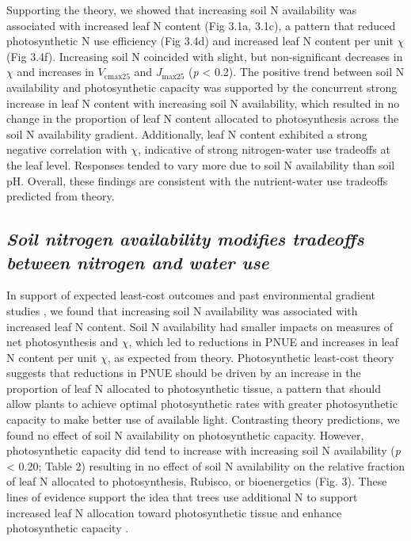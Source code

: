     Supporting the theory, we showed that increasing soil N availability was associated with increased leaf N content (Fig 3.1a, 3.1c), a pattern that reduced photosynthetic N use efficiency (Fig 3.4d) and increased leaf N content per unit $\chi$ (Fig 3.4f). Increasing soil N coincided with slight, but non-significant decreases in $\chi$ and increases in $V_\mathrm{cmax25}$ and $J_\mathrm{max25}$ (\textit{p} < 0.2). The positive trend between soil N availability and photosynthetic capacity was supported by the concurrent strong increase in leaf N content with increasing soil N availability, which resulted in no change in the proportion of leaf N content allocated to photosynthesis across the soil N availability gradient. Additionally, leaf N content exhibited a strong negative correlation with $\chi$, indicative of strong nitrogen-water use tradeoffs at the leaf level. Responses tended to vary more due to soil N availability than soil pH. Overall, these findings are consistent with the nutrient-water use tradeoffs predicted from theory.

    \subsection{\textit{Soil nitrogen availability modifies tradeoffs between nitrogen and water use}}

    In support of expected least-cost outcomes and past environmental gradient studies , we found that increasing soil N availability was associated with increased leaf N content. Soil N availability had smaller impacts on measures of net photosynthesis and $\chi$, which led to reductions in PNUE and increases in leaf N content per unit $\chi$, as expected from theory. Photosynthetic least-cost theory suggests that reductions in PNUE should be driven by an increase in the proportion of leaf N allocated to photosynthetic tissue, a pattern that should allow plants to achieve optimal photosynthetic rates with greater photosynthetic capacity to make better use of available light. Contrasting theory predictions, we found no effect of soil N availability on photosynthetic capacity. However, photosynthetic capacity did tend to increase with increasing soil N availability (\textit{p} < 0.20; Table 2) resulting in no effect of soil N availability on the relative fraction of leaf N allocated to photosynthesis, Rubisco, or bioenergetics (Fig. 3). These lines of evidence support the idea that trees use additional N to support increased leaf N allocation toward photosynthetic tissue and enhance photosynthetic capacity .

